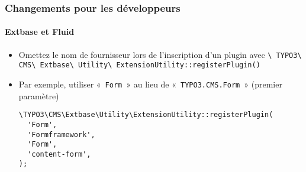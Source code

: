 \begin{frame}[fragile]
	\frametitle{Changements pour les développeurs}
	\framesubtitle{Extbase et Fluid}

	\lstset{basicstyle=\smaller\ttfamily}

	\begin{itemize}
		\item Omettez le nom de fournisseur lors de l'inscription d'un plugin avec\newline
			\smaller
				\texttt{\textbackslash
					TYPO3\textbackslash
					CMS\textbackslash
					Extbase\textbackslash
					Utility\textbackslash
					ExtensionUtility::registerPlugin()}
			\normalsize

		\item Par exemple, utiliser «~\texttt{Form}~» au lieu de «~\texttt{TYPO3.CMS.Form}~»\newline
			\small(premier paramètre)\normalsize

\begin{lstlisting}
\TYPO3\CMS\Extbase\Utility\ExtensionUtility::registerPlugin(
  'Form',
  'Formframework',
  'Form',
  'content-form',
);
\end{lstlisting}

	\end{itemize}

\end{frame}


